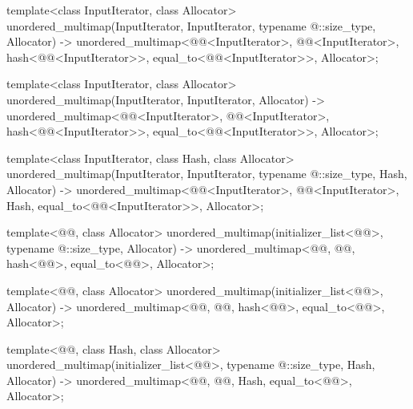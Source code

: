 \documentclass{wg21}
\begin{document}
\begin{codeblock}
{    template<class InputIterator, class Allocator>
    unordered_multimap(InputIterator, InputIterator, typename @\seebelow@::size_type, Allocator)
    -> unordered_multimap<@@<InputIterator>, @@<InputIterator>,
    hash<@@<InputIterator>>,
    equal_to<@@<InputIterator>>, Allocator>;
    
    template<class InputIterator, class Allocator>
    unordered_multimap(InputIterator, InputIterator, Allocator)
    -> unordered_multimap<@@<InputIterator>, @@<InputIterator>,
    hash<@@<InputIterator>>,
    equal_to<@@<InputIterator>>, Allocator>;
    
    template<class InputIterator, class Hash, class Allocator>
    unordered_multimap(InputIterator, InputIterator, typename @\seebelow@::size_type, Hash,
    Allocator)
    -> unordered_multimap<@@<InputIterator>, @@<InputIterator>, Hash,
    equal_to<@@<InputIterator>>, Allocator>;
    
    template<@@, class Allocator>
    unordered_multimap(initializer_list<@@>, typename @\seebelow@::size_type,
    Allocator)
    -> unordered_multimap<@@, @@, hash<@@>, equal_to<@@>, Allocator>;
    
    template<@@, class Allocator>
    unordered_multimap(initializer_list<@@>, Allocator)
    -> unordered_multimap<@@, @@, hash<@@>, equal_to<@@>, Allocator>;
    
    template<@@, class Hash, class Allocator>
    unordered_multimap(initializer_list<@@>, typename @\seebelow@::size_type,
    Hash, Allocator)
    -> unordered_multimap<@@, @@, Hash, equal_to<@@>, Allocator>;
}
\end{codeblock}
\end{document}
